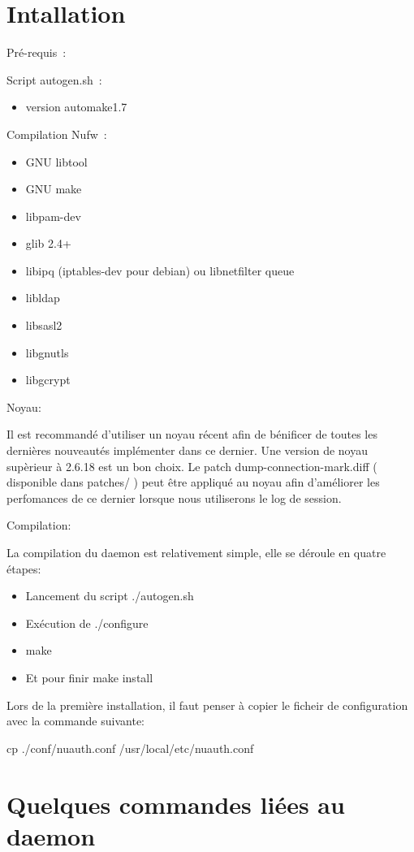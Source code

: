 \documentclass[12pt]{report}
\begin{document}
\begin{itemize}
\section{Intallation}

Pré-requis :

Script autogen.sh :
    \begin{itemize}
      \item version automake1.7
    \end{itemize}
Compilation Nufw :
  \begin{itemize}
    \item GNU libtool
    \item GNU make
    \item libpam-dev
    \item glib 2.4+
    \item libipq (iptables-dev pour debian) ou libnetfilter queue
    \item libldap
    \item libsasl2
    \item libgnutls
    \item libgcrypt
  \end{itemize}

Noyau:

Il est recommandé d'utiliser un noyau récent afin de bénificer de toutes les dernières nouveautés implémenter dans ce dernier.
Une version de noyau supèrieur à 2.6.18 est un bon choix. Le patch dump-connection-mark.diff ( disponible dans patches/ ) 
peut être appliqué au noyau afin d'améliorer les perfomances de ce dernier lorsque nous utiliserons le log de session.

Compilation:

La compilation du daemon est relativement simple, elle se déroule en quatre étapes:
  \begin{itemize}
   \item Lancement du script ./autogen.sh
   \item Exécution de ./configure
   \item make
   \item Et pour finir make install
  \end{itemize}
Lors de la première installation, il faut penser à copier le ficheir de configuration avec la commande suivante:

cp ./conf/nuauth.conf /usr/local/etc/nuauth.conf

\section{Quelques commandes liées au daemon}


\end{itemize}
\end{document}
